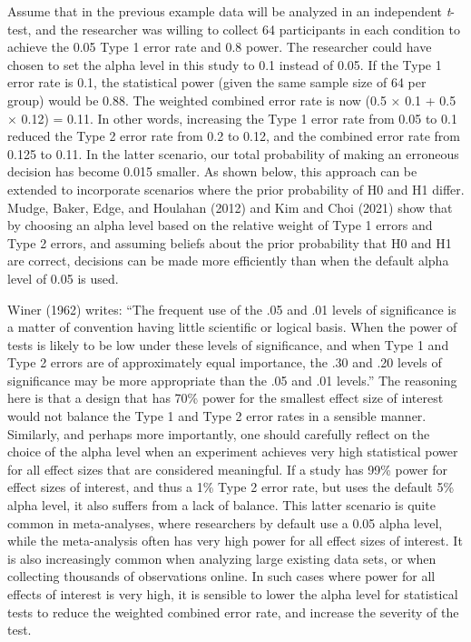 \documentclass[
  english,
  ,man, a4paper,floatsintext]{apa6}
\begin{document}
Assume that in the previous example data will be analyzed in an independent \emph{t}-test, and the researcher was willing to collect 64 participants in each condition to achieve the 0.05 Type 1 error rate and 0.8 power. The researcher could have chosen to set the alpha level in this study to 0.1 instead of 0.05. If the Type 1 error rate is 0.1, the statistical power (given the same sample size of 64 per group) would be 0.88. The weighted combined error rate is now (0.5 × 0.1 + 0.5 × 0.12) = 0.11. In other words, increasing the Type 1 error rate from 0.05 to 0.1 reduced the Type 2 error rate from 0.2 to 0.12, and the combined error rate from 0.125 to 0.11. In the latter scenario, our total probability of making an erroneous decision has become 0.015 smaller. As shown below, this approach can be extended to incorporate scenarios where the prior probability of H0 and H1 differ. Mudge, Baker, Edge, and Houlahan (2012) and Kim and Choi (2021) show that by choosing an alpha level based on the relative weight of Type 1 errors and Type 2 errors, and assuming beliefs about the prior probability that H0 and H1 are correct, decisions can be made more efficiently than when the default alpha level of 0.05 is used.

Winer (1962) writes: ``The frequent use of the .05 and .01 levels of significance is a matter of convention having little scientific or logical basis. When the power of tests is likely to be low under these levels of significance, and when Type 1 and Type 2 errors are of approximately equal importance, the .30 and .20 levels of significance may be more appropriate than the .05 and .01 levels.'' The reasoning here is that a design that has 70\% power for the smallest effect size of interest would not balance the Type 1 and Type 2 error rates in a sensible manner. Similarly, and perhaps more importantly, one should carefully reflect on the choice of the alpha level when an experiment achieves very high statistical power for all effect sizes that are considered meaningful. If a study has 99\% power for effect sizes of interest, and thus a 1\% Type 2 error rate, but uses the default 5\% alpha level, it also suffers from a lack of balance. This latter scenario is quite common in meta-analyses, where researchers by default use a 0.05 alpha level, while the meta-analysis often has very high power for all effect sizes of interest. It is also increasingly common when analyzing large existing data sets, or when collecting thousands of observations online. In such cases where power for all effects of interest is very high, it is sensible to lower the alpha level for statistical tests to reduce the weighted combined error rate, and increase the severity of the test.
\end{document}
